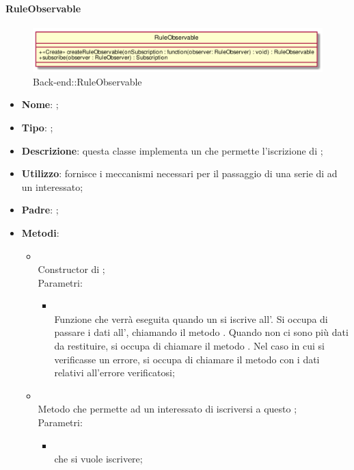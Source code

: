 \hypertarget{RuleObservable_label}{\paragraph{RuleObservable}}
\begin{figure}[h]
	\centering
	\includegraphics[width=\textwidth,height=\textheight,keepaspectratio]{images/ClassRuleObservable.png}
	\caption{Back-end::RuleObservable}
\end{figure}
\begin{itemize}
	\item \textbf{Nome}: ;
	\item \textbf{Tipo}: ;
	\item \textbf{Descrizione}: questa classe implementa un  che permette l'iscrizione di ;
	\item \textbf{Utilizzo}: fornisce i meccanismi necessari per il passaggio di una serie di  ad un  interessato;
	\item \textbf{Padre}: ;
	\item \textbf{Metodi}:
	\begin{itemize}
		\item[]  \\
		Constructor di ;\\
		Parametri:
		\begin{itemize}
			\item {} \\
			Funzione che verrà eseguita quando un  si iscrive all'. Si occupa di passare i dati all', chiamando il metodo . Quando non ci sono più dati da restituire, si occupa di chiamare il metodo . Nel caso in cui si verificasse un errore, si occupa di chiamare il metodo  con i dati relativi all'errore verificatosi;
		\end{itemize}
		\item[]  \\
		Metodo che permette ad un  interessato di iscriversi a questo ;\\
		Parametri:
		\begin{itemize}
			\item {} \\
			 che si vuole iscrivere;
		\end{itemize}
	\end{itemize}
\end{itemize}
\FloatBarrier

